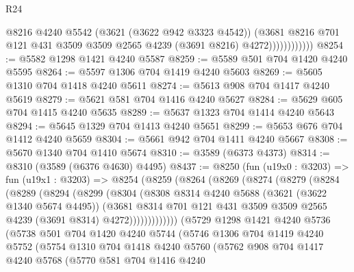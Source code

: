 \begin{lexlean}{R24}
\begin{coremodule}
                          @8216
                          @4240
                          @5542
                          (@3621 (@3622 @942 @3323 @4542))
                          (@3681
                            @8216
                            @701
                            @121
                            @431
                            @3509
                            @3509
                            @2565
                            @4239
                            (@3691 @8216)
                            @4272))))))))))))
@8254 := @5582 @1298 @1421 @4240 @5587
@8259 := @5589 @501 @704 @1420 @4240 @5595
@8264 := @5597 @1306 @704 @1419 @4240 @5603
@8269 := @5605 @1310 @704 @1418 @4240 @5611
@8274 := @5613 @908 @704 @1417 @4240 @5619
@8279 := @5621 @581 @704 @1416 @4240 @5627
@8284 := @5629 @605 @704 @1415 @4240 @5635
@8289 := @5637 @1323 @704 @1414 @4240 @5643
@8294 := @5645 @1329 @704 @1413 @4240 @5651
@8299 := @5653 @676 @704 @1412 @4240 @5659
@8304 := @5661 @942 @704 @1411 @4240 @5667
@8308 := @5670 @1340 @704 @1410 @5674
@8310 := @3589 (@6373 @4373)
@8314 := @8310 (@3589 (@6376 @4630) @4495)
@8437 := @8250
    (fun (u19x0 : @3203) =>
    fun (u19x1 : @3203) =>
    @8254
      (@8259
        (@8264
          (@8269
            (@8274
              (@8279
                (@8284
                  (@8289
                    (@8294
                      (@8299
                        (@8304
                          (@8308
                            @8314
                            @4240
                            @5688
                            (@3621 (@3622 @1340 @5674 @4495))
                            (@3681
                              @8314
                              @701
                              @121
                              @431
                              @3509
                              @3509
                              @2565
                              @4239
                              (@3691 @8314)
                              @4272)))))))))))))
    (@5729
      @1298
      @1421
      @4240
      @5736
      (@5738
        @501
        @704
        @1420
        @4240
        @5744
        (@5746
          @1306
          @704
          @1419
          @4240
          @5752
          (@5754
            @1310
            @704
            @1418
            @4240
            @5760
            (@5762
              @908
              @704
              @1417
              @4240
              @5768
              (@5770
                @581
                @704
                @1416
                @4240

\end{coremodule}
\end{lexlean}

